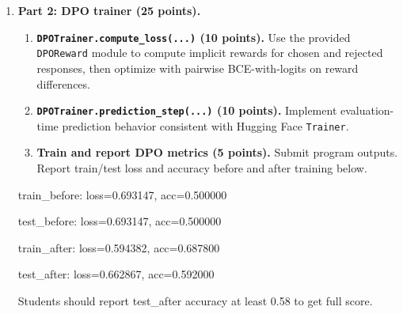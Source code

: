 \begin{Q}
\begin{enumerate}
\begin{enumerate}
\item \textbf{Train and report reward-model evaluatoin metrics (5
    points).}
Submit program outputs.   
Report train/test loss and accuracy before and after training below. 

\begin{solution}

  train\_before: loss=1.086595, acc=0.479800

  test\_before: loss=1.098495, acc=0.487750

  train\_after: loss=0.355826, acc=0.823000

  test\_after: loss=0.732526, acc=0.619500
  
  Students should report test\_after accuracy at least 0.58 to get full score.
\end{solution}

\end{enumerate}

\item \textbf{Part 2: DPO trainer (25 points).}

\begin{enumerate}
\item \textbf{\texttt{DPOTrainer.compute\_loss(...)} (10 points).}
Use the provided \texttt{DPOReward} module to compute implicit rewards for chosen and rejected responses,
then optimize with pairwise BCE-with-logits on reward differences.

\item \textbf{\texttt{DPOTrainer.prediction\_step(...)} (10 points).}
Implement evaluation-time prediction behavior consistent with Hugging Face \texttt{Trainer}.

\item \textbf{Train and report DPO metrics (5 points).}
Submit program outputs.   
Report train/test loss and accuracy before and after training below. 
 \end{enumerate}

\begin{solution}

  train\_before: loss=0.693147, acc=0.500000

  test\_before: loss=0.693147, acc=0.500000

  train\_after: loss=0.594382, acc=0.687800

  test\_after: loss=0.662867, acc=0.592000

  Students should report test\_after accuracy at least 0.58 to get full score.

\end{solution}

\end{enumerate}
\end{Q}

